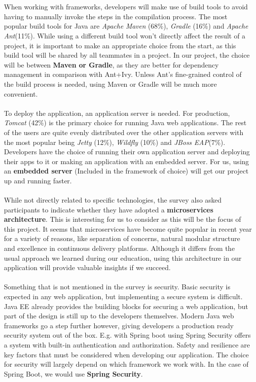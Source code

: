 \documentclass[12pt]{article}
\begin{document}
\begin{multicols}{2}
\\\\
When working with frameworks, developers will make use of build tools to avoid having to manually invoke the steps in the compilation process. The most popular build tools for Java are \textit{Apache Maven} (68\%), \textit{Gradle} (16\%) and \textit{Apache Ant}(11\%). While using a different build tool won't directly affect the result of a project, it is important to make an appropriate choice from the start, as this build tool will be shared by all teammates in a project. In our project, the choice will be between \textbf{Maven or Gradle}, as they are better for dependency management in comparison with Ant+Ivy. Unless Ant's fine-grained control of the build process is needed, using Maven or Gradle will be much more convenient.
\\\\
To deploy the application, an application server is needed. For production, \textit{Tomcat} (42\%) is the primary choice for running Java web applications. The rest of the users are quite evenly distributed over the other application servers with the most popular being \textit{Jetty} (12\%), \textit{Wildfly} (10\%) and \textit{JBoss EAP}(7\%). Developers have the choice of running their own application server and deploying their apps to it or making an application with an embedded server. For us, using an \textbf{embedded server} (Included in the framework of choice) will get our project up and running faster.
\\\\
While not directly related to specific technologies, the survey also asked participants to indicate whether they have adopted a \textbf{microservices architecture}. This is interesting for us to consider as this will be the focus of this project. It seems that microservices have become quite popular in recent year for a variety of reasons, like separation of concerns, natural modular structure and excellence in continuous delivery platforms. \cite{WhyMicroservices48:online} Although it differs from the usual approach we learned during our education, using this architecture in our application will provide valuable insights if we succeed.  
\\\\
Something that is not mentioned in the survey is security. Basic security is expected in any web application, but implementing a secure system is difficult. Java EE already provides the building blocks for securing a web application, but part of the design is still up to the developers themselves.\cite{JavaEESecurity29:online} Modern Java web frameworks go a step further however, giving developers a production ready security system out of the box. E.g. with Spring boot using Spring Security offers a system with built-in authentication and authorization. Safety and resilience are key factors that must be considered when developing our application. The choice for security will largely depend on which framework we work with. In the case of Spring Boot, we would use \textbf{Spring Security}. 

\end{multicols}
\end{document}
